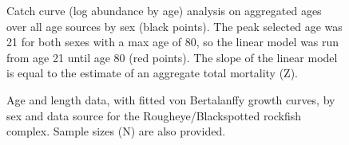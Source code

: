 \documentclass[
]{scrartcl}
\begin{document}
\begin{figure}[H]


\caption{\label{fig-CC_Z_80}Catch curve (log abundance by age) analysis
on aggregated ages over all age sources by sex (black points). The peak
selected age was 21 for both sexes with a max age of 80, so the linear
model was run from age 21 until age 80 (red points). The slope of the
linear model is equal to the estimate of an aggregate total mortality
(Z).}

\end{figure}%

\begin{figure}[H]


\caption{\label{fig-AL_1}Age and length data, with fitted von
Bertalanffy growth curves, by sex and data source for the
Rougheye/Blackspotted rockfish complex. Sample sizes (N) are also
provided.}

\end{figure}%
\end{document}
